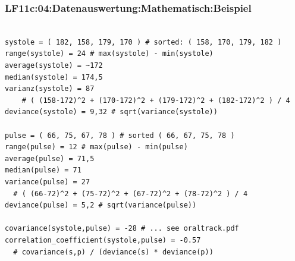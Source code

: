 \begin{frame}[fragile]  
  \frametitle{LF11c:04:Datenauswertung:Mathematisch:Beispiel}

  \begin{center}
  \begin{minipage}{0.9\textwidth}
  \begin{verbatim}

systole = ( 182, 158, 179, 170 ) # sorted: ( 158, 170, 179, 182 )
range(systole) = 24 # max(systole) - min(systole)
average(systole) = ~172
median(systole) = 174,5
varianz(systole) = 87 
    # ( (158-172)^2 + (170-172)^2 + (179-172)^2 + (182-172)^2 ) / 4
deviance(systole) = 9,32 # sqrt(variance(systole))

pulse = ( 66, 75, 67, 78 ) # sorted ( 66, 67, 75, 78 ) 
range(pulse) = 12 # max(pulse) - min(pulse)
average(pulse) = 71,5
median(pulse) = 71
variance(pulse) = 27 
  # ( (66-72)^2 + (75-72)^2 + (67-72)^2 + (78-72)^2 ) / 4
deviance(pulse) = 5,2 # sqrt(variance(pulse))

covariance(systole,pulse) = -28 # ... see oraltrack.pdf
correlation_coefficient(systole,pulse) = -0.57 
  # covariance(s,p) / (deviance(s) * deviance(p))
  \end{verbatim}
  \end{minipage}
  \end{center}

\end{frame}



